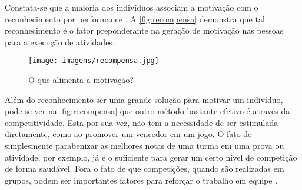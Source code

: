 Constata-se que a maioria dos indivíduos associam a motivação com o reconhecimento por performance \cite{grafico-motivacao:2012}. A \autoref{fig:recompensa} demonstra que tal reconhecimento é o fator preponderante na geração de motivação nas pessoas para a execução de atividades.

\begin{figure}[htb]
    \centering
	\texttt{[image: imagens/recompensa.jpg]}
	\caption{\label{fig:recompensa}O que alimenta a motivação?}
\end{figure}
\FloatBarrier

Além do reconhecimento ser uma grande solução para motivar um indivíduo, pode-se ver na \autoref{fig:recompensa} que outro método bastante efetivo é através da competitividade. Esta por sua vez, não tem a necessidade de ser estimulada diretamente, como ao promover um vencedor em um jogo. O fato de simplesmente parabenizar as melhores notas de uma turma em uma prova ou atividade, por exemplo, já é o suficiente para gerar um certo nível de competição de forma saudável. Fora o fato de que competições, quando são realizadas em grupos, podem ser importantes fatores para reforçar o trabalho em equipe \cite{gamificação-na-ead:2014}.


